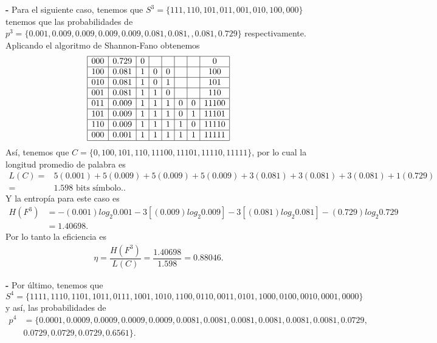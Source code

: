 \begin{sol}
\textbf{-} Para el siguiente caso, tenemos que $S^{3} =\{111 ,110 ,101,011, 001, 010, 100 ,000\}$ tenemos que las probabilidades de $p^{3}=\{0\text{.}001 , 0\text{.}009 , 0\text{.}009 , 0\text{.}009, 0\text{.}009 , 0\text{.}081 , 0\text{.}081, , 0\text{.}081,  0\text{.}729\}$ respectivamente. Aplicando el algoritmo de Shannon-Fano obtenemos  
\[
\begin{array}{|c|c|c|c|c|c|c|c|}
\hline
000 & 0\text{.}729 & 0 & & & & &0\\
\hline
100 & 0\text{.}081 & 1 &0 &0 & & &100\\
\hline
010 & 0\text{.}081 & 1 &0 &1 & & &101\\
\hline
001 & 0\text{.}081 & 1 &1 &0 & & &110\\
\hline
011 & 0\text{.}009 & 1 &1 &1 &0 &0 &11100\\
\hline
101 & 0\text{.}009 & 1 &1 &1 &0 &1 &11101\\
\hline
110 & 0\text{.}009 & 1 &1 &1 &1 &0 &11110\\
\hline
000 & 0\text{.}001 & 1 &1 &1 &1 &1 &11111\\
\hline
\end{array}
\]
Así, tenemos que $C=\{0, 100, 101, 110, 11100, 11101, 11110, 11111\}$, por lo cual la longitud promedio de palabra es 
\begin{align*}
L(C)=&  5(0.001) + 5(0.009) +5(0.009) +5(0.009) + 3(0.081)+3(0.081)+3(0.081) + 1(0.729) \\
=& 1.598 \text{ bits símbolo.}
.\end{align*}
Y la entropía para este caso es
\begin{align*}
    H(F^{3})&=-(0.001)log_2 0.001-3[(0.009)log_2 0.009]-3[(0.081)log_2 0.081 ]-(0.729)log_2 0.729\\
    &= 1.40698
.\end{align*}
Por lo tanto la eficiencia es 
\begin{align*}
    \eta= \dfrac{H(F^{3})}{L(C)}=\dfrac{1.40698}{1.598}=0.88046
.\end{align*}
















\textbf{-} Por último, tenemos que $$S^{4} =\{1111 ,1110 ,1101,1011, 0111, 1001, 1010, 1100, 0110, 0011, 0101, 1000, 0100, 0010, 0001 ,0000\}$$ y así, las probabilidades de 
\begin{align*}
   p^{4}&=\{0\text{.}0001 , 0\text{.}0009 , 0\text{.}0009 , 0\text{.}0009, 0\text{.}0009 , 0\text{.}0081 , 0\text{.}0081, 0\text{.}0081, 0\text{.}0081, 0\text{.}0081, 0\text{.}0081, 0\text{.}0729,\\
& 0\text{.}0729, 0\text{.}0729, 0\text{.}0729, 0.6561\}  
.\end{align*}




\end{sol}
